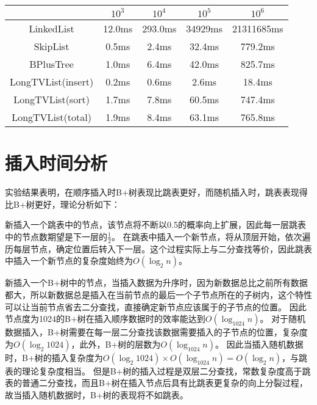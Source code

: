 \documentclass[UTF8]{article}
\begin{document}
\begin{tabular}{|c|c|c|c|c|}

    \hline
     & $10^3$ & $10^4$ & $10^5$ & $10^6$ \\
    \hline
    LinkedList & 12.0ms & 293.0ms & 34929ms & 21311685ms\\
    \hline
    SkipList & 0.5ms & 2.4ms & 32.4ms & 779.2ms\\
    \hline
    BPlusTree & 1.0ms & 6.4ms & 42.0ms & 825.7ms\\
    \hline
    LongTVList(insert) & 0.2ms & 0.6ms & 2.6ms & 18.4ms\\
    \hline
    LongTVList(sort) & 1.7ms & 7.8ms & 60.5ms & 747.4ms\\
    \hline
    LongTVList(total) & 1.9ms & 8.4ms & 63.1ms & 765.8ms\\
    \hline

\end{tabular}

\section{插入时间分析}
实验结果表明，在顺序插入时B+树表现比跳表更好，而随机插入时，跳表表现得比B+树更好，理论分析如下：

新插入一个跳表中的节点，该节点将不断以0.5的概率向上扩展，因此每一层跳表中的节点数期望是下一层的$\frac 12$。
在跳表中插入一个新节点，将从顶层开始，依次遍历每层节点，确定位置后转入下一层。这个过程实际上与二分查找等价，因此跳表中插入一个新节点的复杂度始终为$O(\log_2 n)$。

新插入一个B+树中的节点，当插入数据为升序时，因为新数据总比之前所有数据都大，所以新数据总是插入在当前节点的最后一个子节点所在的子树内，这个特性可以让当前节点省去二分查找，直接确定新节点应该属于的子节点的位置。
因此节点度为1024的B+树在插入顺序数据时的效率能达到$O(\log_{1024} n)$。
对于随机数据插入，B+树需要在每一层二分查找该数据需要插入的子节点的位置，复杂度为$O(\log_{2} 1024)$，此外，B+树的层数为$O(\log_{1024} n)$。
因此当插入随机数据时，B+树的插入复杂度为$O(\log_{2} 1024) \times O(\log_{1024} n) = O(\log_{2} n)$，与跳表的理论复杂度相当。
但是B+树的插入过程是双层二分查找，常数复杂度高于跳表的普通二分查找，而且B+树在插入节点后具有比跳表更复杂的向上分裂过程，故当插入随机数据时，B+树的表现将不如跳表。
\end{document}
